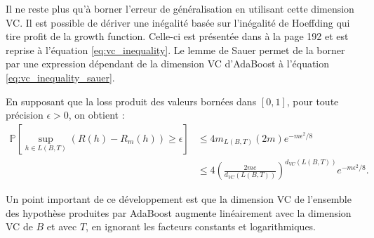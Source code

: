 \documentclass[12pt]{article}
\begin{document}
	Il ne reste plus qu'à borner l'erreur de généralisation en utilisant cette dimension VC.
	Il est possible de dériver une inégalité basée sur l'inégalité de Hoeffding qui tire profit de la growth function.
	Celle-ci est présentée dans \cite{Bousquet2003-oz} à la page 192 et est reprise à l'équation \ref{eq:vc_inequality}.
	Le lemme de Sauer permet de la borner par une expression dépendant de la dimension VC d'AdaBoost à l'équation \ref{eq:vc_inequality_sauer}.
	
	En supposant que la loss produit des valeurs bornées dans $[0, 1]$, pour toute précision $\epsilon > 0$, on obtient :
	\begin{align}
	\mathbb{P}\left[ \sup_{h \in L(B, T)} (R(h) - R_m(h)) \geq \epsilon \right] &\leq 4 m_{L(B, T)}(2 m) e^{-m \epsilon^2 / 8} \label{eq:vc_inequality} \\
	&\leq 4 \left( \frac{2 m e}{d_{VC}(L(B, T))} \right)^{d_{VC}(L(B, T))} e^{-m \epsilon^2 / 8}. \label{eq:vc_inequality_sauer}
	\end{align}

	Un point important de ce développement est que la dimension VC de l'ensemble des hypothèse produites par AdaBoost augmente linéairement avec la dimension VC de $B$ et avec $T$, en ignorant les facteurs constants et logarithmiques.
	
	
	
	
\end{document}
